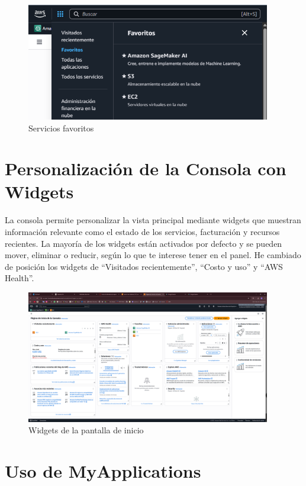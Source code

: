 \documentclass{article}
\begin{document}
	\begin{figure}[h!]
		\centering
		\includegraphics[width=0.95\textwidth]{tarea_2.png}
		\caption{Servicios favoritos}
		\end{figure}
	
	\newpage
	
	\section{Personalización de la Consola con Widgets}

	La consola permite personalizar la vista principal mediante widgets que muestran información relevante como el estado de los servicios, facturación y recursos recientes. La mayoría de los widgets están activados por defecto y se pueden mover, eliminar o reducir, según lo que te interese tener en el panel. He cambiado de posición los widgets de ``Visitados recientemente'', ``Costo y uso'' y ``AWS Health''.

	\begin{figure}[h!]
	\centering
	\includegraphics[width=0.95\textwidth]{tarea_3.png}
	\caption{Widgets de la pantalla de inicio}
	\end{figure}


	\section{Uso de MyApplications}
\end{document}
